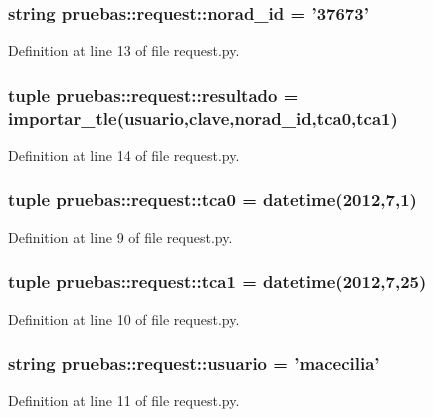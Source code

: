 \subsubsection[{norad\-\_\-id}]{\setlength{\rightskip}{0pt plus 5cm}string {\bf pruebas\-::request\-::norad\-\_\-id} = '37673'}\label{namespacepruebas_1_1request_a743ff3189e7a30f3802f204d807f4d17}


\-Definition at line 13 of file request.\-py.

\subsubsection[{resultado}]{\setlength{\rightskip}{0pt plus 5cm}tuple {\bf pruebas\-::request\-::resultado} = {\bf importar\-\_\-tle}({\bf usuario},{\bf clave},{\bf norad\-\_\-id},{\bf tca0},{\bf tca1})}\label{namespacepruebas_1_1request_a8624e7740ce90c893d34175fbdffcd42}


\-Definition at line 14 of file request.\-py.

\subsubsection[{tca0}]{\setlength{\rightskip}{0pt plus 5cm}tuple {\bf pruebas\-::request\-::tca0} = datetime(2012,7,1)}\label{namespacepruebas_1_1request_a1580b9827fceeab0ee9b153a97c014c8}


\-Definition at line 9 of file request.\-py.

\subsubsection[{tca1}]{\setlength{\rightskip}{0pt plus 5cm}tuple {\bf pruebas\-::request\-::tca1} = datetime(2012,7,25)}\label{namespacepruebas_1_1request_a1f2d3c0e526f58ea41855cdc52c1664c}


\-Definition at line 10 of file request.\-py.

\subsubsection[{usuario}]{\setlength{\rightskip}{0pt plus 5cm}string {\bf pruebas\-::request\-::usuario} = 'macecilia'}\label{namespacepruebas_1_1request_aa25f656d9b762b295e7dde7bc99f4bdd}


\-Definition at line 11 of file request.\-py.

